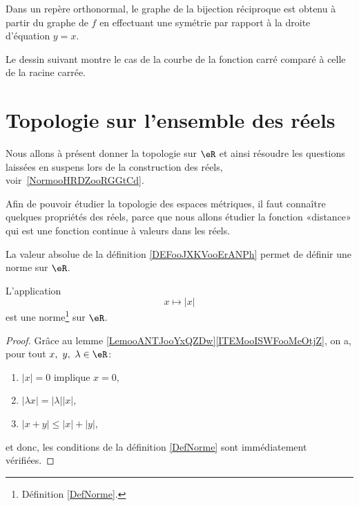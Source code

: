 \begin{Aretenir}
	Dans un repère orthonormal, le graphe de la bijection réciproque est obtenu à partir du graphe de \( f\) en effectuant une symétrie par rapport à la droite d'équation \( y=x\).
\end{Aretenir}

Le dessin suivant montre le cas de la courbe de la fonction carré comparé à celle de la racine carrée.
\begin{center}
	
\end{center}

\section{Topologie sur l'ensemble des réels}
\label{SECooGKHYooMwHQaD}

Nous allons à présent donner la topologie sur \( \eR\) et ainsi résoudre les questions laissées en suspens lors de la construction des réels, voir~\ref{NormooHRDZooRGGtCd}.

Afin de pouvoir étudier la topologie des espaces métriques, il faut connaître quelques propriétés des réels, parce que nous allons étudier la fonction «distance» qui est une fonction continue à valeurs dans les réels.

La valeur absolue de la définition \ref{DEFooJXKVooErANPh} permet de définir une norme sur \( \eR\).
\begin{lemma}       \label{LEMooBNAPooBTtXnX}
	L'application
	\begin{equation}
		x\mapsto | x |
	\end{equation}
	est une norme\footnote{Définition \ref{DefNorme}.} sur \( \eR\).
\end{lemma}

\begin{proof}
	Grâce au lemme \ref{LemooANTJooYxQZDw}\ref{ITEMooISWFooMeOtjZ}, on a, pour tout \(x,\ y,\ \lambda \in \eR \):
	\begin{enumerate}
		\item \( | x |=0\) implique \( x=0\),
		\item \( | \lambda x |=| \lambda | |x |\),
		\item \( | x+y |\leq | x |+| y |\),
	\end{enumerate}
	et donc, les conditions de la définition \ref{DefNorme} sont immédiatement vérifiées.
\end{proof}

